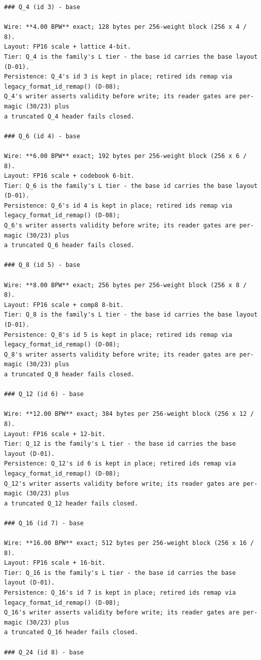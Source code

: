\begin{Verbatim}[breaklines,breakanywhere,fontsize=\footnotesize]
### Q_4 (id 3) - base

Wire: **4.00 BPW** exact; 128 bytes per 256-weight block (256 x 4 / 8).
Layout: FP16 scale + lattice 4-bit.
Tier: Q_4 is the family's L tier - the base id carries the base layout (D-01).
Persistence: Q_4's id 3 is kept in place; retired ids remap via legacy_format_id_remap() (D-08);
Q_4's writer asserts validity before write; its reader gates are per-magic (30/23) plus
a truncated Q_4 header fails closed.

### Q_6 (id 4) - base

Wire: **6.00 BPW** exact; 192 bytes per 256-weight block (256 x 6 / 8).
Layout: FP16 scale + codebook 6-bit.
Tier: Q_6 is the family's L tier - the base id carries the base layout (D-01).
Persistence: Q_6's id 4 is kept in place; retired ids remap via legacy_format_id_remap() (D-08);
Q_6's writer asserts validity before write; its reader gates are per-magic (30/23) plus
a truncated Q_6 header fails closed.

### Q_8 (id 5) - base

Wire: **8.00 BPW** exact; 256 bytes per 256-weight block (256 x 8 / 8).
Layout: FP16 scale + comp8 8-bit.
Tier: Q_8 is the family's L tier - the base id carries the base layout (D-01).
Persistence: Q_8's id 5 is kept in place; retired ids remap via legacy_format_id_remap() (D-08);
Q_8's writer asserts validity before write; its reader gates are per-magic (30/23) plus
a truncated Q_8 header fails closed.

### Q_12 (id 6) - base

Wire: **12.00 BPW** exact; 384 bytes per 256-weight block (256 x 12 / 8).
Layout: FP16 scale + 12-bit.
Tier: Q_12 is the family's L tier - the base id carries the base layout (D-01).
Persistence: Q_12's id 6 is kept in place; retired ids remap via legacy_format_id_remap() (D-08);
Q_12's writer asserts validity before write; its reader gates are per-magic (30/23) plus
a truncated Q_12 header fails closed.

### Q_16 (id 7) - base

Wire: **16.00 BPW** exact; 512 bytes per 256-weight block (256 x 16 / 8).
Layout: FP16 scale + 16-bit.
Tier: Q_16 is the family's L tier - the base id carries the base layout (D-01).
Persistence: Q_16's id 7 is kept in place; retired ids remap via legacy_format_id_remap() (D-08);
Q_16's writer asserts validity before write; its reader gates are per-magic (30/23) plus
a truncated Q_16 header fails closed.

### Q_24 (id 8) - base


\end{Verbatim}
